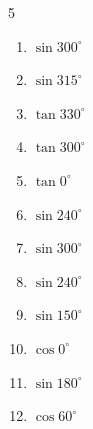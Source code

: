 \begin{multicols}{5}
\begin{enumerate}

  \item $\displaystyle \sin{300^\circ}$


  \item $\displaystyle \sin{315^\circ}$


  \item $\displaystyle \tan{330^\circ}$


  \item $\displaystyle \tan{300^\circ}$


  \item $\displaystyle \tan{0^\circ}$

        \phantom{$\displaystyle =0$}

  \item $\displaystyle \sin{240^\circ}$


  \item $\displaystyle \sin{300^\circ}$


  \item $\displaystyle \sin{240^\circ}$


  \item $\displaystyle \sin{150^\circ}$


  \item $\displaystyle \cos{0^\circ}$

        \phantom{$\displaystyle =1$}

  \item $\displaystyle \sin{180^\circ}$

        \phantom{$\displaystyle =0$}

  \item $\displaystyle \cos{60^\circ}$



\end{enumerate}
\end{multicols}
